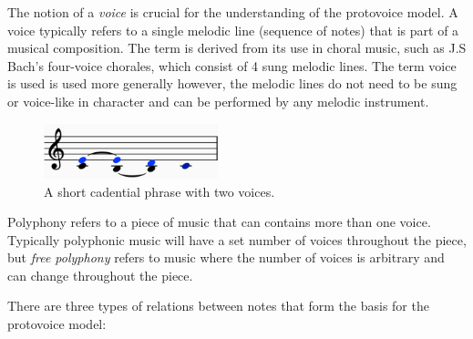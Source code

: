 \documentclass[12pt,a4paper,twoside,openright]{report}
\theoremstyle{definition}
\begin{document}
The notion of a \textit{voice} is crucial for the understanding of the protovoice model.
A voice typically refers to a single melodic line (sequence of notes) that is part of a musical composition.
The term is derived from its use in choral music, such as J.S Bach's four-voice chorales, which consist of 4 sung melodic lines.
The term voice is used is used more generally however, the melodic lines do not need to be sung or voice-like in character and can be performed by any melodic instrument. 


\begin{figure}[h]
  \centering
  \includegraphics[width=0.45\textwidth]{prep/cadencevoices}
  \captionsetup{width=.9\linewidth}
  \caption{A short cadential phrase with two voices.}
  \label{fig:cadenceVoices}
\end{figure}

Polyphony refers to a piece of music that can contains more than one voice.
Typically polyphonic music will have a set number of voices throughout the piece, but \textit{free polyphony} refers to music where the number of voices is arbitrary and can change throughout the piece.

There are three types of relations between notes that form the basis for the protovoice model:
\end{document}
